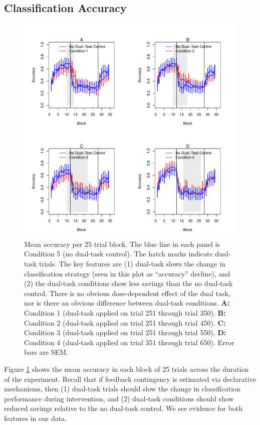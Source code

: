 \subsection*{Classification Accuracy} 
\begin{figure}[t]
  \centering \includegraphics[width=1.0\textwidth]{../figures/fig_learning_curves.pdf}
  \caption{
    Mean accuracy per 25 trial block. The blue line in each panel is Condition
    5 (no dual-task control). The hatch marks indicate dual-task trials. The key
    features are (1) dual-task slows the change in classification strategy (seen
    in this plot as ``accuracy'' decline), and (2) the dual-task conditions show
    less savings than the no dual-task control. There is no obvious 
    dose-dependent effect of the dual task, nor is there an obvious difference
    between dual-task conditions.
    \textbf{A:} Condition 1 (dual-task applied on trial 251 through trial 350).
    \textbf{B:} Condition 2 (dual-task applied on trial 251 through trial 450). 
    \textbf{C:} Condition 3 (dual-task applied on trial 251 through trial 550). 
    \textbf{D:} Condition 4 (dual-task applied on trial 351 through trial 650). 
    Error bars are SEM.
  }
  \label{fig:learning_curves}
\end{figure}

Figure \ref{fig:learning_curves} shows the mean accuracy in each block of 25
trials across the duration of the experiment. Recall that if feedback
contingency is estimated via declarative mechanisms, then (1) dual-task trials
should slow the change in classification performance during intervention, and
(2) dual-task conditions should show reduced savings relative to the no
dual-task control. We see evidence for both features in our data.


